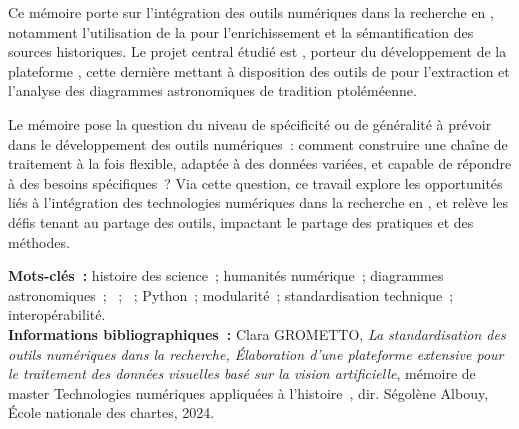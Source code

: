 \medskip	

Ce mémoire porte sur l'intégration des outils numériques dans la recherche en \shs, notamment l'utilisation de la \cv pour l'enrichissement et la sémantification des sources historiques. Le projet central étudié est \eida, porteur du développement de la plateforme \aikon, cette dernière mettant à disposition des outils de \dl pour l'extraction et l'analyse des diagrammes astronomiques de tradition ptoléméenne.

Le mémoire pose la question du niveau de spécificité ou de généralité à prévoir dans le développement des outils numériques~: comment construire une chaîne de traitement à la fois flexible, adaptée à des données variées, et capable de répondre à des besoins spécifiques~? Via cette question, ce travail explore les opportunités liés à l'intégration des technologies numériques dans la recherche en \shs, et relève les défis tenant au partage des outils, impactant le partage des pratiques et des méthodes. 

\textbf{Mots-clés~:} histoire des science~; humanités numérique~; diagrammes astronomiques~; \ia~; \dl~; Python~; modularité~; standardisation technique~; interopérabilité.\\

\textbf{Informations bibliographiques~:} Clara GROMETTO, \textit{La standardisation des outils numériques dans la recherche, Élaboration d'une plateforme extensive pour le traitement des données visuelles basé sur la vision artificielle}, mémoire de master \og Technologies numériques appliquées à l'histoire~\fg, dir. Ségolène Albouy, École nationale des chartes, 2024.
	
\clearemptydoublepage